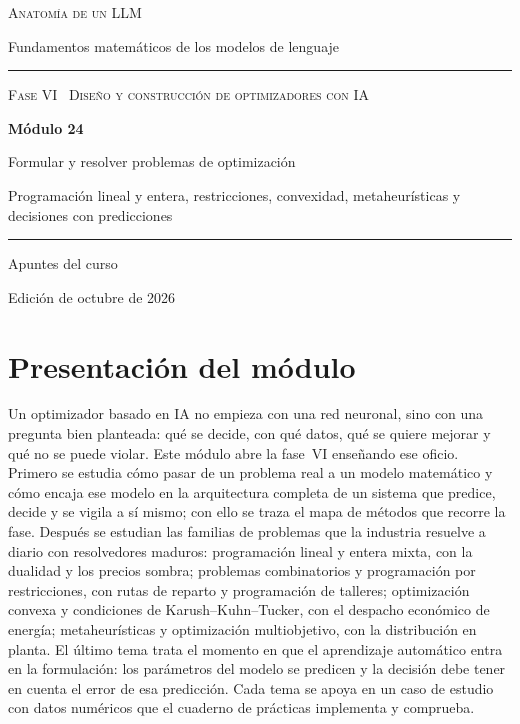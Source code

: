 \documentclass[11pt,a4paper,twoside,openany]{book}
\begin{document}
\frontmatter
\begin{titlepage}
\centering
\vspace*{2.5cm}
{\large\scshape Anatomía de un LLM}\par
\vspace{0.4cm}
{\normalsize Fundamentos matemáticos de los modelos de lenguaje}\par
\vspace{2.2cm}
\rule{\textwidth}{0.8pt}\par\vspace{0.5cm}
{\small\scshape Fase VI \textperiodcentered\ Diseño y construcción de optimizadores con IA}\par\vspace{0.3cm}
{\Huge\bfseries Módulo 24\par}\vspace{0.3cm}
{\LARGE Formular y resolver problemas de optimización\par}
\vspace{0.2cm}
{\large Programación lineal y entera, restricciones, convexidad, metaheurísticas y decisiones con predicciones\par}
\vspace{0.5cm}\rule{\textwidth}{0.4pt}\par
\vspace{1.6cm}
{\large Apuntes del curso}\par
\vfill
{\small Edición de octubre de 2026}\par
\end{titlepage}

\chapter*{Presentación del módulo}

Un optimizador basado en IA no empieza con una red neuronal, sino con una pregunta bien planteada: qué se decide, con qué datos, qué se quiere mejorar y qué no se puede violar. Este módulo abre la fase~VI enseñando ese oficio. Primero se estudia cómo pasar de un problema real a un modelo matemático y cómo encaja ese modelo en la arquitectura completa de un sistema que predice, decide y se vigila a sí mismo; con ello se traza el mapa de métodos que recorre la fase. Después se estudian las familias de problemas que la industria resuelve a diario con resolvedores maduros: programación lineal y entera mixta, con la dualidad y los precios sombra; problemas combinatorios y programación por restricciones, con rutas de reparto y programación de talleres; optimización convexa y condiciones de Karush--Kuhn--Tucker, con el despacho económico de energía; metaheurísticas y optimización multiobjetivo, con la distribución en planta. El último tema trata el momento en que el aprendizaje automático entra en la formulación: los parámetros del modelo se predicen y la decisión debe tener en cuenta el error de esa predicción. Cada tema se apoya en un caso de estudio con datos numéricos que el cuaderno de prácticas implementa y comprueba.
\end{document}
